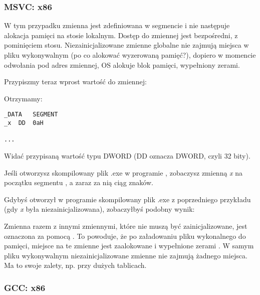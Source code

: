 \subsubsection{MSVC: x86}



W tym przypadku zmienna  jest zdefiniowana w segmencie  i nie następuje alokacja pamięci na stosie lokalnym. Dostęp do zmiennej jest bezpośredni, z pominięciem stosu.
Niezainicjalizowane zmienne globalne nie zajmują miejsca w pliku wykonywalnym (po co alokować wyzerowaną pamięć?), dopiero w momencie odwołania pod adres zmiennej, \ac{OS} alokuje blok pamięci, wypełniony zerami.

Przypiszmy teraz wprost wartość do zmiennej:



Otrzymamy:

\begin{lstlisting}[style=customasmx86]
_DATA	SEGMENT
_x	DD	0aH

...
\end{lstlisting}

Widać przypisaną wartość  typu DWORD  (DD oznacza DWORD, czyli 32 bity).

Jeśli otworzysz skompilowany plik .exe w programie \IDA, zobaczysz zmienną \emph{x} na początku segmentu , a zaraz za nią ciąg znaków.

Gdybyś otworzył w programie \IDA skompilowany plik .exe z poprzedniego przykładu (gdy \emph{x} była niezainicjalizowana), zobaczyłbyś podobny wynik:



\label{BSSClearedByCStd}
Zmienna  razem z innymi zmiennymi, które nie muszą być zainicjalizowane, jest oznaczona za pomocą .
To powoduje, że po załadowaniu pliku wykonalnego do pamięci, miejsce na te zmienne jest zaalokowane i wypełnione zerami .
W samym pliku wykonywalnym niezainicjalizowane zmienne nie zajmują żadnego miejsca. Ma to swoje zalety, np. przy dużych tablicach.



\subsubsection{GCC: x86}

